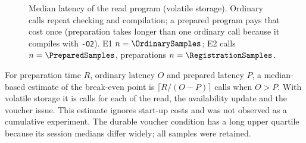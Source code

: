 \documentclass[12pt]{article}
\newcommand{\num}[1]{\pgfmathprintnumber[fixed,precision=2,1000 sep={\mathord{,}}]{#1}}
\newcommand{\code}[1]{\texttt{#1}}
\begin{document}
\begin{figure}[tb]\centering
{}
\caption{Median latency of the read program (volatile storage). Ordinary calls
repeat checking and compilation; a prepared program pays that cost once
(preparation takes longer than one ordinary call because it compiles with \code{-O2}). E1
$n=\OrdinarySamples$; E2 calls $n=\PreparedSamples$, preparations
$n=\RegistrationSamples$.}
\label{fig:reuse}
\end{figure}

\begin{table}[tb]\centering\small
\caption{E2: one-time preparation (median of \RegistrationSamples{}) and
prepared-call latency (median [Q1, Q3] of \PreparedSamples{} calls) per program
and storage mode.}
\label{tab:prepared}

\end{table}

For preparation time $R$, ordinary latency $O$ and prepared latency $P$, a
median-based estimate of the break-even point is $\lceil R/(O-P)\rceil$ calls
when $O>P$. With volatile storage it is \BreakEvenReadCalls{} calls for each of the read, the
availability update and the voucher issue. This estimate ignores start-up costs and was not observed
as a cumulative experiment. The durable voucher condition has a long upper
quartile because its session medians differ widely; all samples were retained.
\end{document}
